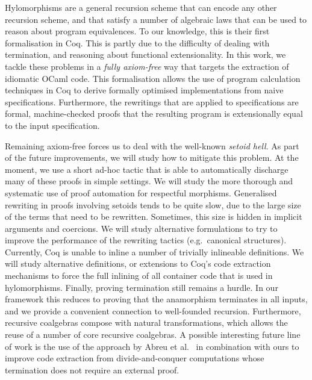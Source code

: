 \documentclass{llncs}
\begin{document}
Hylomorphisms are a general recursion scheme that can encode any other
recursion scheme, and that satisfy a number of algebraic laws that can be used
to reason about program equivalences. To our knowledge, this is their first formalisation
in Coq. This is partly due to the
difficulty of dealing with termination, and reasoning about functional
extensionality. In this work, we tackle these problems in a \emph{fully
axiom-free} way that targets the extraction of idiomatic OCaml code.  This
formalisation allows the use of program calculation techniques in Coq to derive
formally optimised implementations from naive specifications. Furthermore, the
rewritings that are applied to specifications are formal, machine-checked
proofs that the resulting program is extensionally equal to the input
specification. 

Remaining axiom-free forces us to deal with the well-known
\emph{setoid hell}. As part of the future improvements, we will study how to
mitigate this problem. At the moment, we use a short ad-hoc tactic that is able
to automatically discharge many of these proofs in simple settings.  We will
study the more thorough and systematic use of proof automation for respectful
morphisms.  Generalised rewriting in proofs involving setoids tends to be quite
slow, due to the large size of the terms that need to be rewritten. Sometimes,
this size is hidden in implicit arguments and coercions. We will study
alternative formulations to try to improve the performance of the rewriting
tactics (e.g.\ canonical structures).  Currently, Coq is unable to inline a
number of trivially inlineable definitions.  We will study alternative
definitions, or extensions to Coq's code extraction mechanisms to force the
full inlining of all container code that is used in hylomorphisms.  Finally,
proving termination still remains a hurdle. In our framework this reduces to
proving that the anamorphism
terminates in all inputs, and we provide a convenient connection to
well-founded recursion. Furthermore, recursive coalgebras compose with natural
transformations, which allows the reuse
of a number of core recursive coalgebras. A possible interesting future line of work
is the use of the approach by Abreu et al.~\cite{AbreuDHJMS23} in combination with ours to
improve code extraction from divide-and-conquer computations whose termination
does not require an external proof. 




\end{document}
